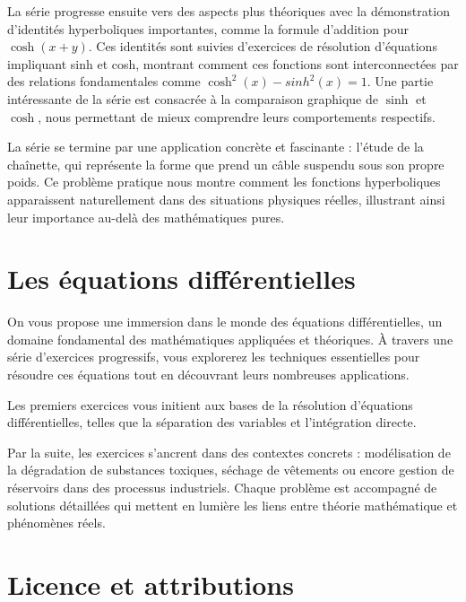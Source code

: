 \documentclass[
  12pt,
  letterpaper,
]{book}
\theoremstyle{remark}
\begin{document}
La série progresse ensuite vers des aspects plus théoriques avec la
démonstration d'identités hyperboliques importantes, comme la formule
d'addition pour \(\cosh(x+y)\). Ces identités sont suivies d'exercices
de résolution d'équations impliquant sinh et cosh, montrant comment ces
fonctions sont interconnectées par des relations fondamentales comme
\(\cosh^2(x) - sinh^2(x) = 1\). Une partie intéressante de la série est
consacrée à la comparaison graphique de \(\sinh\) et \(\cosh\), nous
permettant de mieux comprendre leurs comportements respectifs.

La série se termine par une application concrète et fascinante : l'étude
de la chaînette, qui représente la forme que prend un câble suspendu
sous son propre poids. Ce problème pratique nous montre comment les
fonctions hyperboliques apparaissent naturellement dans des situations
physiques réelles, illustrant ainsi leur importance au-delà des
mathématiques pures.

\hypertarget{les-uxe9quations-diffuxe9rentielles}{%
\section*{Les équations
différentielles}\label{les-uxe9quations-diffuxe9rentielles}}


On vous propose une immersion dans le monde des équations
différentielles, un domaine fondamental des mathématiques appliquées et
théoriques. À travers une série d'exercices progressifs, vous explorerez
les techniques essentielles pour résoudre ces équations tout en
découvrant leurs nombreuses applications.

Les premiers exercices vous initient aux bases de la résolution
d'équations différentielles, telles que la séparation des variables et
l'intégration directe.

Par la suite, les exercices s'ancrent dans des contextes concrets :
modélisation de la dégradation de substances toxiques, séchage de
vêtements ou encore gestion de réservoirs dans des processus
industriels. Chaque problème est accompagné de solutions détaillées qui
mettent en lumière les liens entre théorie mathématique et phénomènes
réels.

\hypertarget{licence-et-attributions}{%
\section*{Licence et attributions}\label{licence-et-attributions}}
\end{document}
